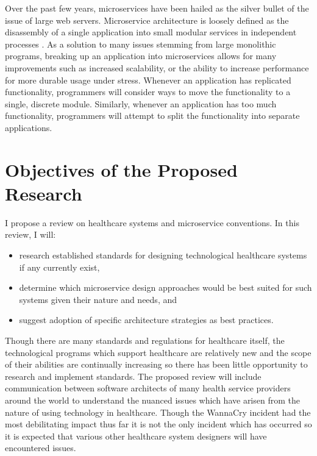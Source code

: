 \documentclass[10pt, oneside, letterpaper]{article}
\begin{document}
\begin{multicols}{2}
	Over the past few years, microservices have been hailed as the silver bullet of the issue of large web servers. Microservice architecture is loosely defined as the disassembly of a single application into small modular services in independent processes \cite{Lewis2014}. As a solution to many issues stemming from large monolithic programs, breaking up an application into microservices allows for many improvements such as increased scalability, or the ability to increase performance for more durable usage under stress. Whenever an application has replicated functionality, programmers will consider ways to move the functionality to a single, discrete module. Similarly, whenever an application has too much functionality, programmers will attempt to split the functionality into separate applications.

	\section{Objectives of the Proposed Research}

	I propose a review on healthcare systems and microservice conventions. In this review, I will:

	\begin{itemize}
		\item research established standards for designing technological healthcare systems if any currently exist,
		\item determine which microservice design approaches would be best suited for such systems given their nature and needs, and
		\item suggest adoption of specific architecture strategies as best practices.
	\end{itemize}

	Though there are many standards and regulations for healthcare itself, the technological programs which support healthcare are relatively new and the scope of their abilities are continually increasing so there has been little opportunity to research and implement standards. The proposed review will include communication between software architects of many health service providers around the world to understand the nuanced issues which have arisen from the nature of using technology in healthcare. Though the WannaCry incident had the most debilitating impact thus far it is not the only incident which has occurred so it is expected that various other healthcare system designers will have encountered issues.


\end{multicols}
\end{document}
